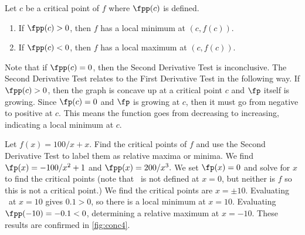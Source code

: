 \begin{theorem}\label{thm:second_der}
Let $c$ be a critical point of $f$ where $\fpp(c)$ is defined. 
\begin{enumerate}
\item If $\fpp(c)>0$, then $f$ has a local minimum at $(c,f(c))$.
\item If $\fpp(c)<0$, then $f$ has a local maximum at $(c,f(c))$.
\end{enumerate}
\end{theorem}

Note that if $\fpp(c)=0$, then the Second Derivative Test is inconclusive. The Second Derivative Test relates to the First Derivative Test in the following way. If $\fpp(c)>0$, then the graph is concave up at a critical point $c$ and $\fp$ itself is growing.  Since $\fp(c)=0$ and $\fp$ is growing at $c$, then it must go from negative to positive at $c$.  This means the function goes from decreasing to increasing, indicating a local minimum at $c$.

\begin{example}\label{ex_conc4}
Let $f(x)=100/x + x$.  Find the critical points of $f$ and use the Second Derivative Test to label them as relative maxima or minima.
%
%
\solution
We find $\fp(x)=-100/x^2+1$ and $\fpp(x) = 200/x^3.$  We set $\fp(x)=0$ and solve for $x$ to find the critical points (note that \fp\ is not defined at $x=0$, but neither is $f$ so this is not a critical point.) We find  the critical points are $x=\pm 10$.  Evaluating \fpp\ at $x=10$ gives $0.1>0$, so there is a local minimum at $x=10$.  Evaluating $\fpp(-10)=-0.1<0$, determining a relative maximum at  $x=-10$. These results are confirmed in \autoref{fig:conc4}.
\end{example}

